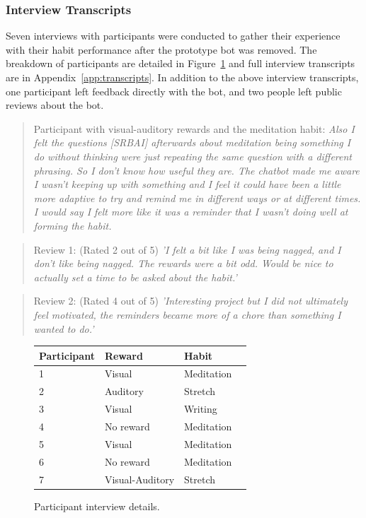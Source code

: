 \subsubsection*{Interview Transcripts}
Seven interviews with participants were conducted to gather their experience with their habit performance after the prototype bot was removed. The breakdown of participants are detailed in Figure~\ref{fig:interview_details} and full interview transcripts are in Appendix~\ref{app:transcripts}. In addition to the above interview transcripts, one participant left feedback directly with the bot, and two people left public reviews about the bot.

\begin{quote}
Participant with visual-auditory rewards and the meditation habit: \textit{Also I felt the questions [SRBAI] afterwards about meditation being something I do without thinking were just repeating the same question with a different phrasing. So I don't know how useful they are. The chatbot made me aware I wasn't keeping up with something and I feel it could have been a little more adaptive to try and remind me in different ways or at different times. I would say I felt more like it was a reminder that I wasn't doing well at forming the habit.}
\end{quote}
\begin{quote}
Review 1: (Rated 2 out of 5) \textit{'I felt a bit like I was being nagged, and I don't like being nagged. The rewards were a bit odd. Would be nice to actually set a time to be asked about the habit.'}
\end{quote}
\begin{quote}
Review 2: (Rated 4 out of 5) \textit{'Interesting project but I did not ultimately feel motivated, the reminders became more of a chore than something I wanted to do.'}
\end{quote}

\begin{figure}[H] %
\begin{center}
\begin{tabular}{ |p{3cm}|p{2.8cm}|p{3cm}|p{2cm}| }
 \hline
 \textbf{Participant} & \textbf{Reward} & \textbf{Habit} \\ \hline
 1 & Visual & Meditation \\ \hline
 2 & Auditory & Stretch \\ \hline
 3 & Visual & Writing \\ \hline
 4 & No reward & Meditation \\ \hline
 5 & Visual & Meditation \\ \hline
 6 & No reward & Meditation \\ \hline
 7 & Visual-Auditory & Stretch \\ \hline
\end{tabular}
\end{center}
    \caption{Participant interview details.}
    \label{fig:interview_details}

\end{figure}


